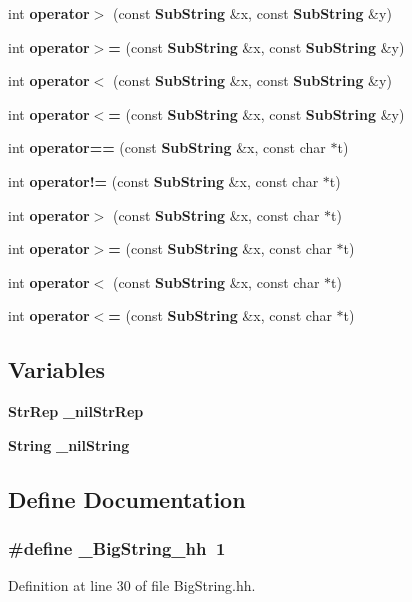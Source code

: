 \begin{CompactItemize}
\item 
int {\bf operator$>$} (const {\bf Sub\-String} \&x, const {\bf Sub\-String} \&y)
\item 
int {\bf operator$>$=} (const {\bf Sub\-String} \&x, const {\bf Sub\-String} \&y)
\item 
int {\bf operator$<$} (const {\bf Sub\-String} \&x, const {\bf Sub\-String} \&y)
\item 
int {\bf operator$<$=} (const {\bf Sub\-String} \&x, const {\bf Sub\-String} \&y)
\item 
int {\bf operator==} (const {\bf Sub\-String} \&x, const char $\ast$t)
\item 
int {\bf operator!=} (const {\bf Sub\-String} \&x, const char $\ast$t)
\item 
int {\bf operator$>$} (const {\bf Sub\-String} \&x, const char $\ast$t)
\item 
int {\bf operator$>$=} (const {\bf Sub\-String} \&x, const char $\ast$t)
\item 
int {\bf operator$<$} (const {\bf Sub\-String} \&x, const char $\ast$t)
\item 
int {\bf operator$<$=} (const {\bf Sub\-String} \&x, const char $\ast$t)
\end{CompactItemize}
\subsection*{Variables}
\begin{CompactItemize}
\item 
{\bf Str\-Rep} {\bf \_\-nil\-Str\-Rep}
\item 
{\bf String} {\bf \_\-nil\-String}
\end{CompactItemize}


\subsection{Define Documentation}
\subsubsection{\setlength{\rightskip}{0pt plus 5cm}\#define \_\-Big\-String\_\-hh\ 1}\label{BigString_8hh_a0}




Definition at line 30 of file Big\-String.hh.
